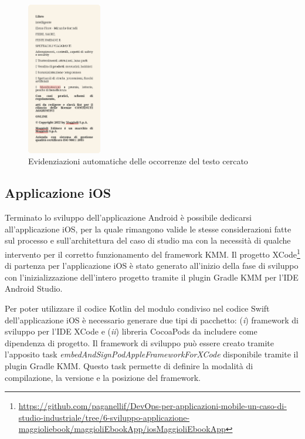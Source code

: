 \begin{multicols}{3}
            \begin{figure}[H]
                \centering
                \includegraphics[width=0.29\textwidth]{img/ricerca_testo2.png}
                \caption{Evidenziazioni automatiche delle occorrenze del testo cercato}
                \label{ricerca_testo2-android}
            \end{figure}
\end{multicols}

\subsection{Applicazione iOS}
Terminato lo sviluppo dell'applicazione Android è possibile dedicarsi all'applicazione iOS,
per la quale rimangono valide le stesse considerazioni fatte sul processo e sull'architettura del caso di studio ma con la necessità di qualche intervento per il corretto funzionamento del framework KMM. 
Il progetto XCode\footnote{\href{https://github.com/paganellif/DevOps-per-applicazioni-mobile-un-caso-di-studio-industriale/tree/6-sviluppo-applicazione-maggioliebook/maggioliEbookApp/iosMaggioliEbookApp}{https://github.com/paganellif/DevOps-per-applicazioni-mobile-un-caso-di-studio-industriale/tree/6-sviluppo-applicazione-maggioliebook/maggioliEbookApp/iosMaggioliEbookApp}} di partenza per l'applicazione iOS è stato generato all'inizio della fase di sviluppo con l'inizializzazione dell'intero progetto tramite il plugin Gradle KMM per l'IDE Android Studio.

Per poter utilizzare il codice Kotlin del modulo condiviso nel codice Swift dell'applicazione iOS è necessario generare due tipi di pacchetto: 
(\textit{i}) framework di sviluppo per l'IDE XCode e (\textit{ii}) libreria CocoaPods da includere come dipendenza di progetto. 
Il framework di sviluppo può essere creato tramite l'apposito task \textit{embedAndSignPodAppleFrameworkForXCode} disponibile tramite il plugin Gradle KMM. 
Questo task permette di definire la modalità di compilazione, 
la versione e la posizione del framework.

